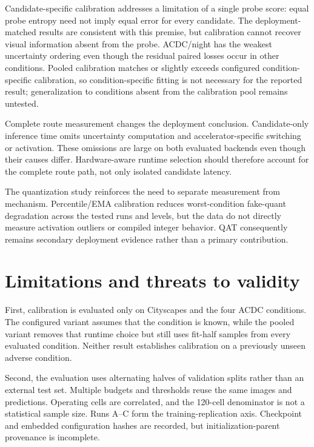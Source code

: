 \documentclass[a4paper,review,12pt]{elsarticle}
\begin{document}
Candidate-specific calibration addresses a limitation of a single probe score: equal probe entropy need not imply equal error for every candidate. The deployment-matched results are consistent with this premise, but calibration cannot recover visual information absent from the probe. ACDC/night has the weakest uncertainty ordering even though the residual paired losses occur in other conditions. Pooled calibration matches or slightly exceeds configured condition-specific calibration, so condition-specific fitting is not necessary for the reported result; generalization to conditions absent from the calibration pool remains untested.

Complete route measurement changes the deployment conclusion. Candidate-only inference time omits uncertainty computation and accelerator-specific switching or activation. These omissions are large on both evaluated backends even though their causes differ. Hardware-aware runtime selection should therefore account for the complete route path, not only isolated candidate latency.

The quantization study reinforces the need to separate measurement from mechanism. Percentile/EMA calibration reduces worst-condition fake-quant degradation across the tested runs and levels, but the data do not directly measure activation outliers or compiled integer behavior. QAT consequently remains secondary deployment evidence rather than a primary contribution.

\section{Limitations and threats to validity}
\label{sec:limitations}

First, calibration is evaluated only on Cityscapes and the four ACDC conditions. The configured variant assumes that the condition is known, while the pooled variant removes that runtime choice but still uses fit-half samples from every evaluated condition. Neither result establishes calibration on a previously unseen adverse condition.

Second, the evaluation uses alternating halves of validation splits rather than an external test set. Multiple budgets and thresholds reuse the same images and predictions. Operating cells are correlated, and the 120-cell denominator is not a statistical sample size. Runs A--C form the training-replication axis. Checkpoint and embedded configuration hashes are recorded, but initialization-parent provenance is incomplete.
\end{document}
